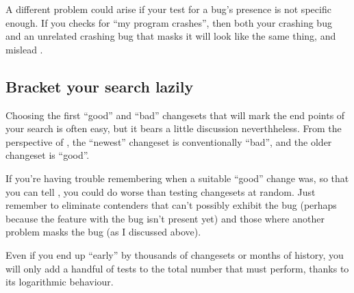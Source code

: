A different problem could arise if your test for a bug's presence is
not specific enough.  If you checks for ``my program crashes'', then
both your crashing bug and an unrelated crashing bug that masks it
will look like the same thing, and mislead .

\subsection{Bracket your search lazily}

Choosing the first ``good'' and ``bad'' changesets that will mark the
end points of your search is often easy, but it bears a little
discussion neverthheless.  From the perspective of , the
``newest'' changeset is conventionally ``bad'', and the older
changeset is ``good''.

If you're having trouble remembering when a suitable ``good'' change
was, so that you can tell , you could do worse than
testing changesets at random.  Just remember to eliminate contenders
that can't possibly exhibit the bug (perhaps because the feature with
the bug isn't present yet) and those where another problem masks the
bug (as I discussed above).

Even if you end up ``early'' by thousands of changesets or months of
history, you will only add a handful of tests to the total number that
 must perform, thanks to its logarithmic behaviour.

